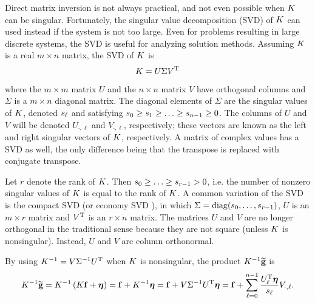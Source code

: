 Direct matrix inversion is not always practical, and not even possible when $K$ can be singular. Fortunately, the singular value decomposition (SVD) of $K$ can used instead if the system is not too large. Even for problems resulting in large discrete systems, the SVD is useful for analyzing solution methods.  Assuming $K$ is a real $m \times n$ matrix, the SVD of $K$ is
\begin{equation}
K = U\Sigma{V^{\mathrm{T}}}
\label{eq:SVD}
\end{equation}
where the $m \times m$ matrix $U$ and the $n \times n$ matrix $V$ have orthogonal columns and $\Sigma$ is a $m \times n$ diagonal matrix. The diagonal elements of $\Sigma$ are the singular values of $K$, denoted $s_\ell$ and satisfying $s_0 \geq s_1 \geq \ldots \geq s_{n-1} \geq 0$. The columns of $U$ and $V$ will be denoted $U_{\cdot,\ell}$ and $V_{\cdot,\ell}$, respectively; these vectors are known as the left and right singular vectors of $K$, respectively. A matrix of complex values has a SVD as well, the only difference being that the transpose is replaced with conjugate transpose. \par
Let $r$ denote the rank of $K$. Then $s_0 \geq \ldots \geq s_{r-1} > 0$, i.e. the number of nonzero singular values of $K$ is equal to the rank of $K$.  A common variation of the SVD is the compact SVD (or economy SVD \cite{GolubVanLoan2013}), in which $\Sigma = \operatorname{diag}(s_0,\ldots,s_{r-1})$, $U$ is an $m \times r$ matrix and $V^{\mathrm{T}}$ is an $r \times n$ matrix. The matrices $U$ and $V$ are no longer orthogonal in the traditional sense because they are not square (unless $K$ is nonsingular). Instead, $U$ and $V$ are column orthonormal. \par 
By using $K^{-1} = V\Sigma^{-1}U^{\mathrm{T}}$ when $K$ is nonsingular, the product $K^{-1}\widetilde{\mathbf{g}}$ is
\begin{equation}
K^{-1}\widetilde{\mathbf{g}} = K^{-1}\left(K\mathbf{f} + \bm{\eta}\right) = \mathbf{f} + K^{-1}\bm{\eta} = \mathbf{f} + V\Sigma^{-1}{U^{\mathrm{T}}}\bm{\eta} = \mathbf{f} + \sum_{\ell = 0}^{n-1} \frac{{U^{\mathrm{T}}_\ell}\bm{\eta}}{s_\ell}V_{\cdot,\ell}. 
\label{eq:InvProd}
\end{equation}
